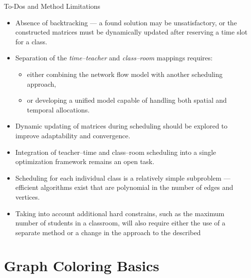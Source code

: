 \documentclass[10pt]{beamer}
\begin{document}
\begin{frame}{To-Dos and Method Limitations}

\small



\begin{itemize}
    \item Absence of backtracking — a found solution may be unsatisfactory, or the constructed matrices must be dynamically updated after reserving a time slot for a class.
    \item Separation of the \textit{time–teacher} and \textit{class–room} mappings requires:
    \begin{itemize}
        \item either combining the network flow model with another scheduling approach,
        \item or developing a unified model capable of handling both spatial and temporal allocations.
    \end{itemize}
    \item Dynamic updating of matrices during scheduling should be explored to improve adaptability and convergence.
    \item Integration of teacher–time and class–room scheduling into a single optimization framework remains an open task.
    \item Scheduling for each individual class is a relatively simple subproblem — efficient algorithms exist that are polynomial in the number of edges and vertices.
    \item Taking into account additional hard constrains, such as the maximum number of students in a classroom, will also require either the use of a separate method or a change in the approach to the described
\end{itemize}

\end{frame}


\section{Graph Coloring Basics}
\end{document}
